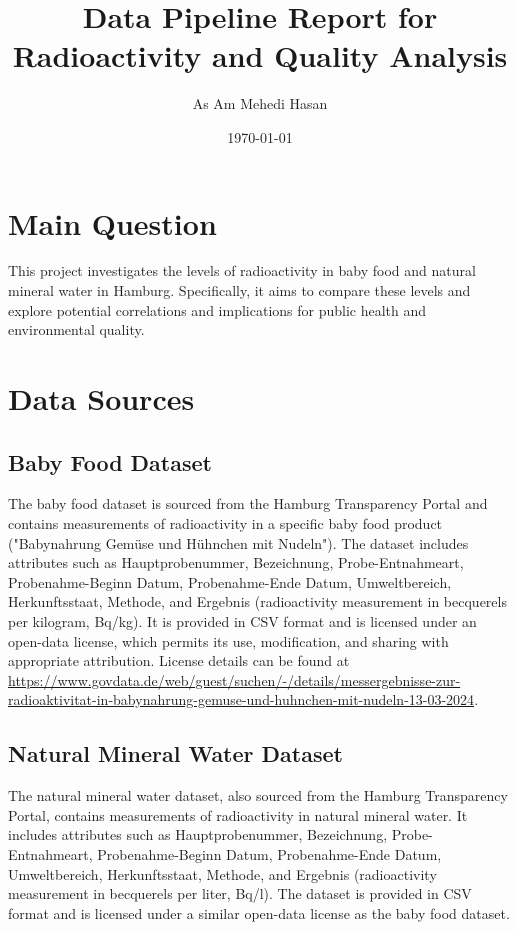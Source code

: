 \documentclass{article}
\title{Data Pipeline Report for Radioactivity and Quality Analysis}
\author{As Am Mehedi Hasan}
\date{\today}
\begin{document}
\maketitle

\section{Main Question}
This project investigates the levels of radioactivity in baby food and natural mineral water in Hamburg. Specifically, it aims to compare these levels and explore potential correlations and implications for public health and environmental quality.

\section{Data Sources}

\subsection{Baby Food Dataset}
The baby food dataset is sourced from the Hamburg Transparency Portal and contains measurements of radioactivity in a specific baby food product ("Babynahrung Gemüse und Hühnchen mit Nudeln"). The dataset includes attributes such as Hauptprobenummer, Bezeichnung, Probe-Entnahmeart, Probenahme-Beginn Datum, Probenahme-Ende Datum, Umweltbereich, Herkunftsstaat, Methode, and Ergebnis (radioactivity measurement in becquerels per kilogram, Bq/kg). It is provided in CSV format and is licensed under an open-data license, which permits its use, modification, and sharing with appropriate attribution. License details can be found at \url{https://www.govdata.de/web/guest/suchen/-/details/messergebnisse-zur-radioaktivitat-in-babynahrung-gemuse-und-huhnchen-mit-nudeln-13-03-2024}.

\subsection{Natural Mineral Water Dataset}
The natural mineral water dataset, also sourced from the Hamburg Transparency Portal, contains measurements of radioactivity in natural mineral water. It includes attributes such as Hauptprobenummer, Bezeichnung, Probe-Entnahmeart, Probenahme-Beginn Datum, Probenahme-Ende Datum, Umweltbereich, Herkunftsstaat, Methode, and Ergebnis (radioactivity measurement in becquerels per liter, Bq/l). The dataset is provided in CSV format and is licensed under a similar open-data license as the baby food dataset.
\end{document}

